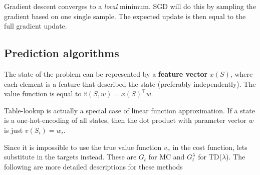 Gradient descent converges to a \textit{local} minimum. SGD will do this by sampling the gradient based on one single sample. The expected update is then equal to the full gradient update.

\subsection{Prediction algorithms}

The state of the problem can be represented by a \textbf{feature vector} $x(S)$, where each element is a feature that described the state (preferably independently). The value function is equal to $\hat{v}(S, w) = x(S)^\intercal w$.

Table-lookup is actually a special case of linear function approximation. If a state is a one-hot-encoding of all states, then the dot product with parameter vector $w$ is just $v(S_i) = w_i$.

Since it is impossible to use the true value function $v_\pi$ in the cost function, lets substitute in the targets instead. These are $G_t$ for MC and $G^\lambda_t$ for TD($\lambda$). The following are more detailed descriptions for these methods

